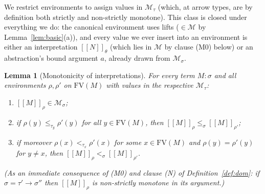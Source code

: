 \documentclass{amsart}
\newtheorem{lemma}{Lemma}
\theoremstyle{definition}
\newcommand{\interp}[1]{[\![#1]\!]}
\newcommand{\FV}{\mathrm{FV}}
\begin{document}
We restrict environments to assign values in $\mathcal M_\tau$ (which, at arrow types, are by
definition both strictly and non-strictly monotone). This class is closed under everything we
do: the canonical environment uses lifts ($\in\mathcal M$ by Lemma~\ref{lem:basic}(a)), and
every value we ever insert into an environment is either an interpretation $\interp{N}_\theta$
(which lies in $\mathcal M$ by clause (M0) below) or an abstraction's bound argument $a$,
already drawn from $\mathcal M_\sigma$.

\begin{lemma}[Monotonicity of interpretations]\label{lem:official}
For every term $M:\sigma$ and all environments $\rho,\rho'$ on $\FV(M)$ \emph{with values in
the respective $\mathcal M_\tau$}:
\begin{enumerate}
\item[\textup{(M0)}] $\interp{M}_\rho\in\mathcal M_\sigma$;
\item[\textup{(M$\le$)}] if $\rho(y)\le_{\tau_y}\rho'(y)$ for all $y\in\FV(M)$, then
  $\interp{M}_\rho\le_\sigma\interp{M}_{\rho'}$;
\item[\textup{(M$<$)}] if moreover $\rho(x)<_{\tau_x}\rho'(x)$ for some $x\in\FV(M)$ and
  $\rho(y)=\rho'(y)$ for $y\ne x$, then $\interp{M}_\rho<_\sigma\interp{M}_{\rho'}$.
\end{enumerate}
\textup{(}As an immediate consequence of \textup{(M0)} and clause \textup{(N)} of
Definition~\ref{def:dom}: if $\sigma=\tau'\to\sigma''$ then $\interp{M}_\rho$ is non-strictly
monotone in its argument.\textup{)}
\end{lemma}
\end{document}

